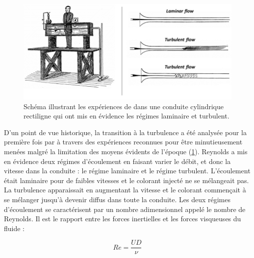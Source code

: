 \begin{figure}[!hbtp]
    \centering
    \includegraphics[width=0.925\linewidth]{Chap1/Pictures/Reynolds_Experiment.png}
    \caption{Schéma illustrant les expériences de \citet{Reynolds1883} dans une conduite cylindrique rectiligne qui ont mis en évidence les régimes laminaire et turbulent.}
    \label{fig/reynolds_experiments}
\end{figure}

D'un point de vue historique, la transition à la turbulence a été analysée pour la première fois par \citet{Reynolds1883} à travers des expériences reconnues pour être minutieusement menées malgré la limitation des moyens évidents de l'époque (\cref{fig/reynolds_experiments}). Reynolds a mis en évidence deux régimes d'écoulement en faisant varier le débit, et donc la vitesse dans la conduite : le régime laminaire et le régime turbulent. L'écoulement était laminaire pour de faibles vitesses et le colorant injecté ne se mélangeait pas. La turbulence apparaissait en augmentant la vitesse et le colorant commençait à se mélanger jusqu'à devenir diffus dans toute la conduite. Les deux régimes d'écoulement se caractérisent par un nombre adimensionnel appelé le nombre de Reynolds. Il est le rapport entre les forces inertielles et les forces visqueuses du fluide :

\begin{equation*}
    Re = \frac{U D}{\nu}
\end{equation*}

